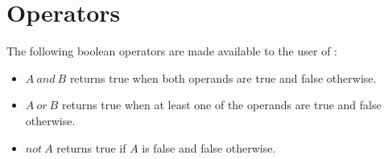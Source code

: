 \section{Operators}

The following boolean operators are made available to the user of \productname:


\begin{itemize}
\item $A \: and \: B$ returns true when both operands are true and false otherwise. 
\item $A \: or \: B$ returns true when at least one of the operands are true and false otherwise.
\item $not \: A$ returns true if $A$ is false and false otherwise.
\end{itemize}

